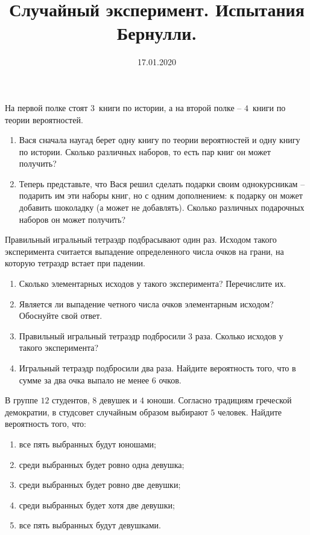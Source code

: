 \documentclass[a4paper, 12pt]{article}
\title{Случайный эксперимент. Испытания Бернулли.}
\date{17.01.2020}
\begin{document}
\begin{problem}
На первой полке стоят $3$~книги по истории, а на второй полке 
-- $4$~книги по теории вероятностей.
\begin{enumerate}
\item Вася сначала наугад берет одну книгу по теории вероятностей 
и одну книгу по истории. Сколько различных наборов, то есть пар 
книг он может получить?
\item Теперь представьте, что Вася решил сделать подарки своим 
однокурсникам -- подарить им эти наборы книг, но с одним дополнением: 
к подарку он может добавить шоколадку (а может не добавлять). 
Сколько различных подарочных наборов он может получить?
\end{enumerate}
\end{problem}

\begin{problem}
Правильный игральный тетраэдр подбрасывают один раз. 
Исходом такого эксперимента считается выпадение определенного 
числа очков на грани, на которую тетраэдр встает при падении.
\begin{enumerate}
\item Сколько элементарных исходов у такого эксперимента? 
Перечислите их. 
\item Является ли выпадение четного числа очков элементарным исходом? 
Обоснуйте свой ответ.
\item Правильный игральный тетраэдр подбросили $3$ 
раза. Сколько исходов у такого эксперимента? 
\item Игральный тетраэдр подбросили два раза. Найдите вероятность того, что 
в сумме за два очка выпало не менее $6$ очков. 
\end{enumerate}
\end{problem}

\begin{problem}
В группе $12$ студентов, $8$ девушек и $4$ юноши. 
Согласно традициям греческой демократии, 
в студсовет случайным образом выбирают $5$ человек. 
Найдите вероятность того, что: 
\begin{enumerate}
\item все пять выбранных будут юношами;
\item среди выбранных будет ровно одна девушка;
\item среди выбранных будет ровно две девушки;
\item среди выбранных будет хотя две девушки;
\item все пять выбранных будут девушками.
\end{enumerate}
\end{problem}
\end{document}

